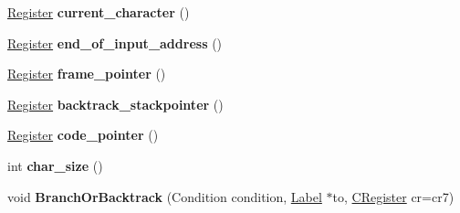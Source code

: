 \begin{DoxyCompactItemize}
\item 
\hyperlink{structv8_1_1internal_1_1_register}{Register} {\bfseries current\+\_\+character} ()\hypertarget{classv8_1_1internal_1_1_reg_exp_macro_assembler_s390_acfb6a5c98371adeba84d5f8fcd8c6c8c}{}\label{classv8_1_1internal_1_1_reg_exp_macro_assembler_s390_acfb6a5c98371adeba84d5f8fcd8c6c8c}

\item 
\hyperlink{structv8_1_1internal_1_1_register}{Register} {\bfseries end\+\_\+of\+\_\+input\+\_\+address} ()\hypertarget{classv8_1_1internal_1_1_reg_exp_macro_assembler_s390_aa98eb342e86a16a940dd4dfeb7f672a9}{}\label{classv8_1_1internal_1_1_reg_exp_macro_assembler_s390_aa98eb342e86a16a940dd4dfeb7f672a9}

\item 
\hyperlink{structv8_1_1internal_1_1_register}{Register} {\bfseries frame\+\_\+pointer} ()\hypertarget{classv8_1_1internal_1_1_reg_exp_macro_assembler_s390_aff3e68cf3fa3fe0a657d36e6aedcbabe}{}\label{classv8_1_1internal_1_1_reg_exp_macro_assembler_s390_aff3e68cf3fa3fe0a657d36e6aedcbabe}

\item 
\hyperlink{structv8_1_1internal_1_1_register}{Register} {\bfseries backtrack\+\_\+stackpointer} ()\hypertarget{classv8_1_1internal_1_1_reg_exp_macro_assembler_s390_aec4c7bb26cb14ec186f5fd1cc7ea6e20}{}\label{classv8_1_1internal_1_1_reg_exp_macro_assembler_s390_aec4c7bb26cb14ec186f5fd1cc7ea6e20}

\item 
\hyperlink{structv8_1_1internal_1_1_register}{Register} {\bfseries code\+\_\+pointer} ()\hypertarget{classv8_1_1internal_1_1_reg_exp_macro_assembler_s390_a7aa3224ed9002f078463a26366ba749e}{}\label{classv8_1_1internal_1_1_reg_exp_macro_assembler_s390_a7aa3224ed9002f078463a26366ba749e}

\item 
int {\bfseries char\+\_\+size} ()\hypertarget{classv8_1_1internal_1_1_reg_exp_macro_assembler_s390_a3519c6316da963a30016bf586b10348f}{}\label{classv8_1_1internal_1_1_reg_exp_macro_assembler_s390_a3519c6316da963a30016bf586b10348f}

\item 
void {\bfseries Branch\+Or\+Backtrack} (Condition condition, \hyperlink{classv8_1_1internal_1_1_label}{Label} $\ast$to, \hyperlink{structv8_1_1internal_1_1_c_register}{C\+Register} cr=cr7)\hypertarget{classv8_1_1internal_1_1_reg_exp_macro_assembler_s390_a0344754317c1cd4324cd837e610cf96c}{}\label{classv8_1_1internal_1_1_reg_exp_macro_assembler_s390_a0344754317c1cd4324cd837e610cf96c}


\end{DoxyCompactItemize}

